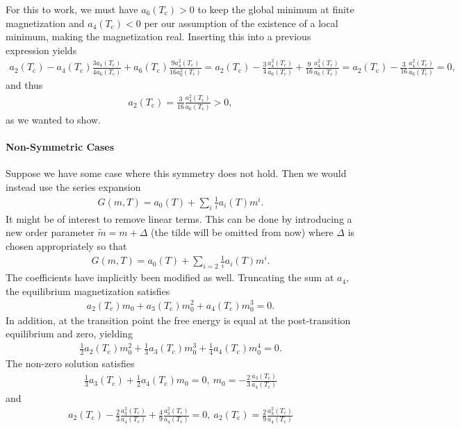 For this to work, we must have $a_{6}(T_{\text{c}}) > 0$ to keep the global minimum at finite magnetization and $a_{4}(T_{\text{c}}) < 0$ per our assumption of the existence of a local minimum, making the magnetization real. Inserting this into a previous expression yields
\begin{align*}
	a_{2}(T_{\text{c}}) - a_{4}(T_{\text{c}})\frac{3a_{4}(T_{\text{c}})}{4a_{6}(T_{\text{c}})} + a_{6}(T_{\text{c}})\frac{9a_{4}^{2}(T_{\text{c}})}{16a_{6}^{2}(T_{\text{c}})} = a_{2}(T_{\text{c}}) - \frac{3}{4}\frac{a_{4}^{2}(T_{\text{c}})}{a_{6}(T_{\text{c}})} + \frac{9}{16}\frac{a_{4}^{2}(T_{\text{c}})}{a_{6}(T_{\text{c}})} = a_{2}(T_{\text{c}}) - \frac{3}{16}\frac{a_{4}^{2}(T_{\text{c}})}{a_{6}(T_{\text{c}})} = 0,
\end{align*}
and thus
\begin{align*}
	a_{2}(T_{\text{c}}) = \frac{3}{16}\frac{a_{4}^{2}(T_{\text{c}})}{a_{6}(T_{\text{c}})} > 0,
\end{align*}
as we wanted to show.

\paragraph{Non-Symmetric Cases}
Suppose we have some case where this symmetry does not hold. Then we would instead use the series expansion
\begin{align*}
	G(m, T) = a_{0}(T) + \sum\limits_{i}\frac{1}{i}a_{i}(T)m^{i}.
\end{align*}
It might be of interest to remove linear terms. This can be done by introducing a new order parameter $\tilde{m} = m + \Delta$ (the tilde will be omitted from now) where $\Delta$ is chosen appropriately so that
\begin{align*}
	G(m, T) = a_{0}(T) + \sum\limits_{i = 2}\frac{1}{i}a_{i}(T)m^{i}.
\end{align*}
The coefficients have implicitly been modified as well. Truncating the sum at $a_{4}$, the equilibrium magnetization satisfies
\begin{align*}
	a_{2}(T_{\text{c}})m_{0} + a_{3}(T_{\text{c}})m_{0}^{2} + a_{4}(T_{\text{c}})m_{0}^{3} = 0.
\end{align*}
In addition, at the transition point the free energy is equal at the post-transition equilibrium and zero, yielding
\begin{align*}
	\frac{1}{2}a_{2}(T_{\text{c}})m_{0}^{2} + \frac{1}{3}a_{3}(T_{\text{c}})m_{0}^{3} + \frac{1}{4}a_{4}(T_{\text{c}})m_{0}^{4} = 0.
\end{align*}
The non-zero solution satisfies
\begin{align*}
	\frac{1}{3}a_{3}(T_{\text{c}}) + \frac{1}{2}a_{4}(T_{\text{c}})m_{0} = 0,\ m_{0} = -\frac{2}{3}\frac{a_{3}(T_{\text{c}})}{a_{4}(T_{\text{c}})}
\end{align*}
and
\begin{align*}
	a_{2}(T_{\text{c}}) - \frac{2}{3}\frac{a_{3}^{2}(T_{\text{c}})}{a_{4}(T_{\text{c}})} + \frac{4}{9}\frac{a_{3}^{2}(T_{\text{c}})}{a_{4}(T_{\text{c}})} = 0,\ a_{2}(T_{\text{c}}) = \frac{2}{9}\frac{a_{3}^{2}(T_{\text{c}})}{a_{4}(T_{\text{c}})}
\end{align*}

